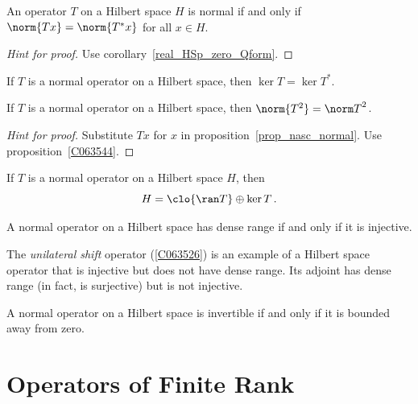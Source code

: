 \begin{prop}\label{prop_nasc_normal} An operator $T$ on a Hilbert space $H$ is normal if and only if
$\norm{Tx} = \norm{T^*x}$ for all $x \in H$.
\end{prop}

\begin{proof}[\emph{Hint for proof}] Use corollary~\ref{real_HSp_zero_Qform}.  \ns
\end{proof}

\begin{cor} If $T$ is a normal operator on a Hilbert space, then $\ker T = \ker T^*$.
\end{cor}

\begin{prop} If $T$ is a normal operator on a Hilbert space, then $\norm{T^2} = {\norm T}^2$.
\end{prop}

\begin{proof}[\emph{Hint for proof}] Substitute $Tx$ for $x$ in proposition~\ref{prop_nasc_normal}. Use
proposition~\ref{C063544}.  \ns
\end{proof}

\begin{prop} If $T$ is a normal operator on a Hilbert space $H$, then
   \[ H = \clo{\ran T} \oplus \ker T\,.  \]
\end{prop}

\begin{cor} A normal operator on a Hilbert space has dense range if and only if it is injective.
\end{cor}

\begin{exam} The \emph{unilateral shift} operator (\ref{C063526}) is an example of a Hilbert space operator that is injective
but does not have dense range.  Its adjoint has dense range (in fact, is surjective) but is not injective.
\end{exam}

\begin{cor} A normal operator on a Hilbert space is invertible if and only if it is bounded away from zero.
\end{cor}
















\section{Operators of Finite Rank}

